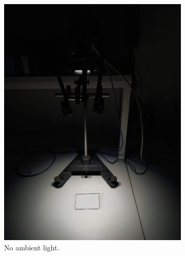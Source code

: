 \begin{figure}[h]
\begin{subfigure}{0.3333\textwidth}
        \includegraphics[width=0.95\linewidth]{figures/project_setup_unlit.png}
        \caption{No ambient light.}
        \label{fig:picture_of_setup_unlit}
    \end{subfigure}%
    \begin{subfigure}{0.3333\textwidth}
        \centering

\end{subfigure}
\end{figure}
